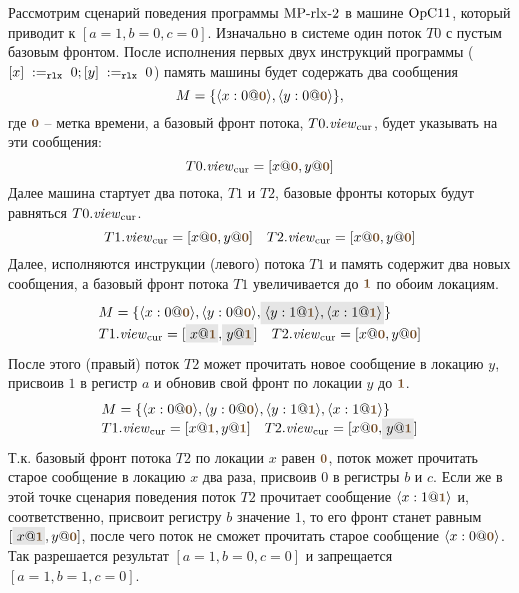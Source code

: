 Рассмотрим сценарий поведения программы  ${\rm MP\text{-}rlx\text{-}2}$ в машине $\mathrm{OpC11}$,
который приводит к $[a = 1, b = 0, c = 0]$.
Изначально в системе один поток $T0$ с пустым базовым фронтом.
После исполнения первых двух инструкций программы
($[x] \;:=_{\mathtt{rlx}}\;0; [y] \;:=_{\mathtt{rlx}}\;0$) память машины будет содержать два сообщения 
\[
M = \{\angled{x:0@\tstamp{0}}, \angled{y:0@\tstamp{0}}\},
\]
где $\tstamp{0}$ -- метка времени, а базовый фронт потока, $T0.\mathit{view}_{\mathrm{cur}}$, будет указывать на эти сообщения:
\[
T0.\Rcur = [x@\tstamp{0}, y@\tstamp{0}]
\]
Далее машина стартует два потока, $T1$ и $T2$, базовые фронты которых будут равняться $T0.\mathit{view}_{\mathrm{cur}}$.
\[
T1.\Rcur = [x@\tstamp{0}, y@\tstamp{0}] \quad T2.\Rcur = [x@\tstamp{0}, y@\tstamp{0}]
\]
Далее, исполняются инструкции (левого) потока $T1$ и память содержит два новых сообщения,
а базовый фронт потока $T1$ увеличивается до $\tstamp{1}$ по обоим локациям.
\[
\begin{array}{l}
M = \{\angled{x:0@\tstamp{0}}, \angled{y:0@\tstamp{0}},\graybox{\angled{y:1@\tstamp{1}},\angled{x:1@\tstamp{1}}}\} \\
T1.\Rcur = [\graybox{x@\tstamp{1}}, \graybox{y@\tstamp{1}}] \quad T2.\Rcur = [x@\tstamp{0}, y@\tstamp{0}]
\end{array}
\]
После этого (правый) поток $T2$ может прочитать новое сообщение в локацию $y$, присвоив $1$ в регистр $a$
и обновив свой фронт по локации $y$ до $\tstamp{1}$.
\[
\begin{array}{l}
M = \{\angled{x:0@\tstamp{0}}, \angled{y:0@\tstamp{0}},\angled{y:1@\tstamp{1}},\angled{x:1@\tstamp{1}}\} \\
T1.\Rcur = [x@\tstamp{1}, y@\tstamp{1}] \quad T2.\Rcur = [x@\tstamp{0}, \graybox{y@\tstamp{1}}]
\end{array}
\]
Т.к. базовый фронт потока $T2$ по локации $x$ равен $\tstamp{0}$, поток может прочитать старое сообщение в локацию $x$
два раза, присвоив $0$ в регистры $b$ и $c$.
Если же в этой точке сценария поведения поток $T2$ прочитает сообщение $\angled{x:1@\tstamp{1}}$ и, соответственно,
присвоит регистру $b$ значение $1$, то его фронт станет равным $[\graybox{x@\tstamp{1}}, y@\tstamp{0}]$, после чего
поток не сможет прочитать старое сообщение $\angled{x:0@\tstamp{0}}$. Так разрешается результат $[a = 1, b = 0, c = 0]$
и запрещается $[a = 1, b = 1, c = 0]$.

